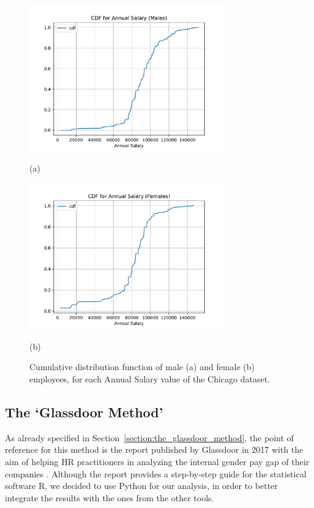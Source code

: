 \begin{figure}[t!]
\centering
\includegraphics[width=0.75\textwidth]{figures/chicago_cdf_annual_salary_males.pdf}
\caption*{(a)}
\includegraphics[width=0.75\textwidth]{figures/chicago_cdf_annual_salary_females.pdf}
\caption*{(b)}
\caption{Cumulative distribution function of male (a) and female (b) employees, for each \textrm{Annual Salary} value of the Chicago dataset.}
\label{fig:chicago_preprocessing2}
\end{figure}


\subsection{The `Glassdoor Method'}
As already specified in Section~\ref{section:the_glassdoor_method}, the point of reference for this method is the report published by Glassdoor in 2017 with the aim of helping HR practitioners in analyzing the internal gender pay gap of their companies \cite{chamberlain2017analyze}. Although the report provides a step-by-step guide for the statistical software R, we decided to use Python for our analysis, in order to better integrate the results with the ones from the other tools.

